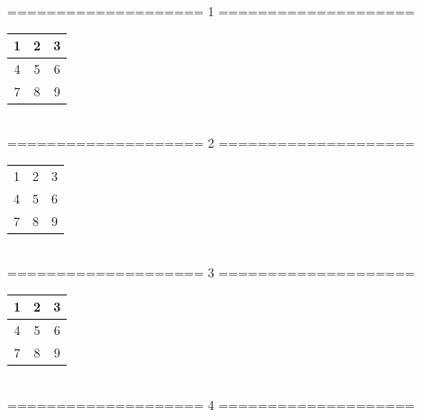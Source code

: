 \documentclass[12pt, a4paper, onecolumn]{article}
\begin{document}
 \begin{center}
		
====================  1  ====================\\[15pt]
%

\begin{tabular}{|c|c|c|}
	
	\hline
	1 & 2 & 3\\
	\hline
	4 & 5 & 6\\
	\hline
	7 & 8 & 9\\
	\hline
	
\end{tabular}\\[20pt]


====================  2  ====================\\[15pt]
%
\begin{tabular}{|ccc|}
	
	\hline
	1 & 2 & 3\\
	4 & 5 & 6\\
	7 & 8 & 9\\
	\hline
	
\end{tabular}\\[20pt]



====================  3  ====================\\[15pt]
% 
%

\begin{tabular}{c|c|c}
	
	1 & 2 & 3\\
	\hline
	4 & 5 & 6\\
	\hline
	7 & 8 & 9\\
	
\end{tabular}\\[20pt]



====================  4  ====================\\[15pt]

\begin{tabular}{ccc}
	

\end{tabular}
\end{center}
\end{document}
